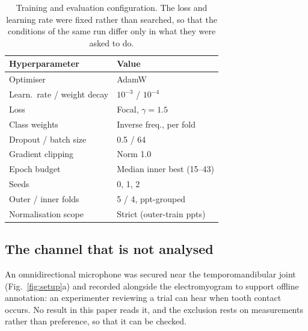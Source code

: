 \documentclass[pdflatex,sn-nature,iicol]{sn-jnl}
\begin{document}
\begin{table}[t]
  \caption{Training and evaluation configuration. The loss and learning rate were fixed rather than searched, so that the conditions of the same run differ only in what they were asked to do.}
  \label{tab:hyperparameters}
  \centering
  \footnotesize
  \begin{tabular*}{\columnwidth}{@{\extracolsep{\fill}}ll@{}}
    \toprule
    Hyperparameter & Value \\
    \midrule
    Optimiser & AdamW \\
    Learn.\ rate / weight decay & $10^{-3}$ / $10^{-4}$ \\
    Loss & Focal, $\gamma = 1.5$ \\
    Class weights & Inverse freq., per fold \\
    Dropout / batch size & 0.5 / 64 \\
    Gradient clipping & Norm 1.0 \\
    Epoch budget & Median inner best (15--43) \\
    Seeds & 0, 1, 2 \\
    Outer / inner folds & 5 / 4, ppt-grouped \\
    Normalisation scope & Strict (outer-train ppts) \\
    \bottomrule
  \end{tabular*}
\end{table}

\subsection{The channel that is not analysed}
\label{sec:mic}

An omnidirectional microphone was secured near the temporomandibular joint (Fig.~\ref{fig:setup}a) and recorded alongside the electromyogram to support offline annotation: an experimenter reviewing a trial can hear when tooth contact occurs. No result in this paper reads it, and the exclusion rests on measurements rather than preference, so that it can be checked.
\end{document}
